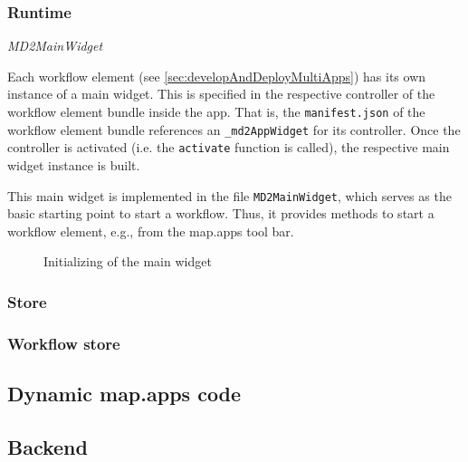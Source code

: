 \subsubsection{Runtime}

\textit{MD2MainWidget}

Each workflow element (see \ref{sec:developAndDeployMultiApps}) has its own instance of a \MD main widget. This is specified in the respective controller of the workflow element bundle inside the app. That is, the \texttt{manifest.json} of the workflow element bundle references an \texttt{\_md2AppWidget} for its controller. Once the controller is activated (i.e. the \texttt{activate} function is called), the respective \MD main widget instance is built. 

This \MD main widget is implemented in the file \texttt{MD2MainWidget}, which serves as the basic starting point to start a workflow. Thus, it provides methods to start a workflow element, e.g., from the map.apps tool bar.

\begin{figure}[htb!]
\centering
{}
\caption{Initializing of the \MD main widget}
\label{fig:MD2MainWidget}
\end{figure}

\subsubsection{Store}

\subsubsection{Workflow store}


\subsection{Dynamic map.apps code}

\subsection{Backend}